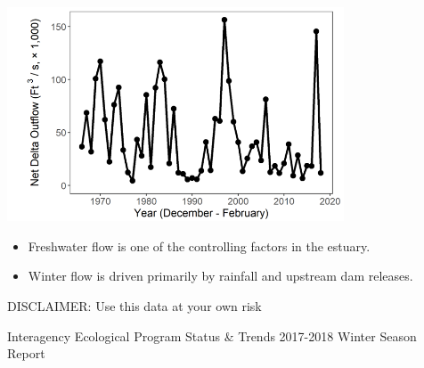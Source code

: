 \documentclass[]{article}\usepackage[]{graphicx}\usepackage[]{color}
\begin{document}
\begin{Row}
\begin{Cell}{5}
\begin{center}
{\begin{itemize}[leftmargin=1cm,rightmargin=1cm]
        \end{itemize}
      }
    \end{center}
  \end{Cell}  
  \begin{Cell}{5}
    \begin{center}
      \includegraphics[width=10cm,trim=0 0 0 0,clip,align=m]{figures/outflow_tmp.png}
      \vspace{10pt}
      {\large 
        \begin{itemize}[leftmargin=1cm,rightmargin=1cm]
          \item Freshwater flow is one of the controlling factors in the estuary.
          \item Winter flow is driven primarily by rainfall and upstream dam releases.
        \end{itemize}
      }
    \end{center}
  \end{Cell}
\end{Row}

\vspace{30pt}

\begin{Row}
  \begin{Cell}{1}
    \begin{center}
      {\large DISCLAIMER: Use this data at your own risk}
    \end{center}
  \end{Cell}
\end{Row}


\newpage


\hypertarget{page:secchi}{}
\begin{Row}
  \begin{Cell}{1}
    \begin{center}
      {\Large Interagency Ecological Program Status \& Trends 2017-2018 Winter Season Report}
    \end{center}
  \end{Cell}
\end{Row}
\end{document}
